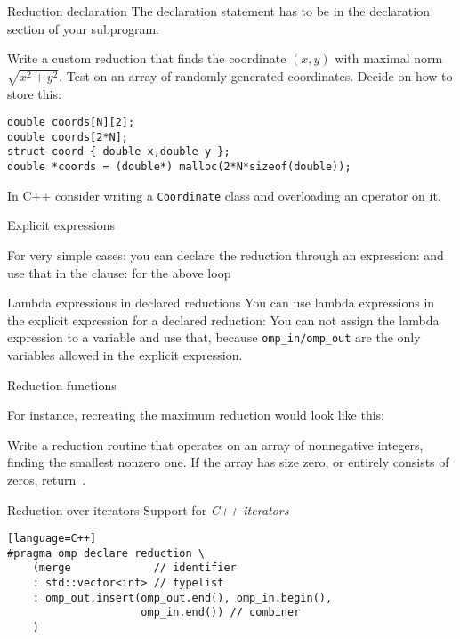 \begin{fortrannote}{Reduction declaration}
  The declaration statement has to be in the declaration section of your subprogram.
\end{fortrannote}

\begin{exercise}
  \label{ex:omp-reduct-coord}
  Write a custom reduction that finds the coordinate $(x,y)$
  with maximal norm $\sqrt{x^2+y^2}$.
  Test on an array of randomly generated coordinates. Decide on how to store this:
\begin{lstlisting}
double coords[N][2];
double coords[2*N];
struct coord { double x,double y };
double *coords = (double*) malloc(2*N*sizeof(double));
\end{lstlisting}
In C++ consider writing a \lstinline{Coordinate} class
and overloading an operator on it.
\end{exercise}

 {Explicit expressions}

For very simple cases:
%
%
you can declare the reduction through an expression:
%
%
and use that in the  clause:
%
%
for the above loop
%

\begin{cppnote}{Lambda expressions in declared reductions}
  You can use lambda expressions in the explicit expression
  for a declared reduction:
  You can not assign the lambda expression to a variable and use that,
  because \lstinline[language=omp]{omp_in/omp_out} are the only variables allowed
  in the explicit expression.
\end{cppnote}

 {Reduction functions}

For instance, recreating the maximum reduction would look like this:
%

\begin{exercise}
  Write a reduction routine that operates on an array of nonnegative
  integers, finding the smallest nonzero one. If the array has size
  zero, or entirely consists of zeros, return~.
\end{exercise}

\begin{cppnote}{Reduction over iterators}
  Support for
  \emph{C++ iterators}
\begin{lstlisting}[language=omp][language=C++]
#pragma omp declare reduction \
    (merge             // identifier 
    : std::vector<int> // typelist
    : omp_out.insert(omp_out.end(), omp_in.begin(), 
                     omp_in.end()) // combiner
    ) 
\end{lstlisting}
\end{cppnote}

